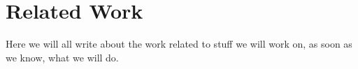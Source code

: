 \section{Related Work}

Here we will all write about the work related to stuff we will work on, as soon as we know, what we will do.